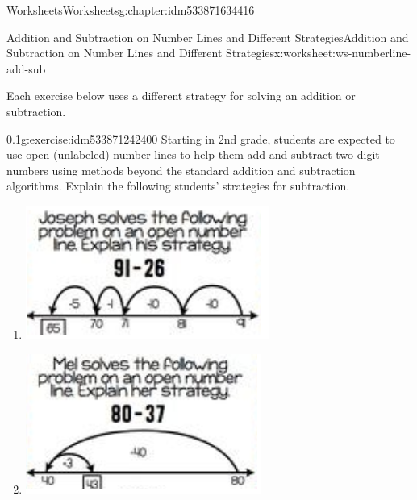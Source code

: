 \documentclass[twoside,11pt,]{book}
\begin{document}
\begin{chapterptx}{Worksheets}{}{Worksheets}{}{}{g:chapter:idm533871634416}
\begin{worksheet-section-numberless}{Addition and Subtraction on Number Lines and Different Strategies}{}{Addition and Subtraction on Number Lines and Different Strategies}{}{}{x:worksheet:ws-numberline-add-sub}
\begin{introduction}{}%
Each exercise below uses a different strategy for solving an addition or subtraction.%
\end{introduction}%
\begin{divisionexercise}{1}{}{0.1}{g:exercise:idm533871242400}%
Starting in 2nd grade, students are expected to use open (unlabeled) number lines to help them add and subtract two-digit numbers using methods beyond the standard addition and subtraction algorithms.   Explain the following students’ strategies for subtraction.%
%
\begin{enumerate}[label=(\alph*)]
\item{}\begin{sidebyside}{1}{0.15}{0.15}{0}%
\begin{sbspanel}{0.7}%
\includegraphics[width=1\linewidth]{images/numberline-add-sub-1a.png}
\end{sbspanel}%
\end{sidebyside}%
%
\item{}\begin{sidebyside}{1}{0.15}{0.15}{0}%
\begin{sbspanel}{0.7}%
\includegraphics[width=1\linewidth]{images/numberline-add-sub-1b.png}

\end{sbspanel}
\end{sidebyside}
\end{enumerate}
\end{divisionexercise}
\end{worksheet-section-numberless}
\end{chapterptx}
\end{document}
